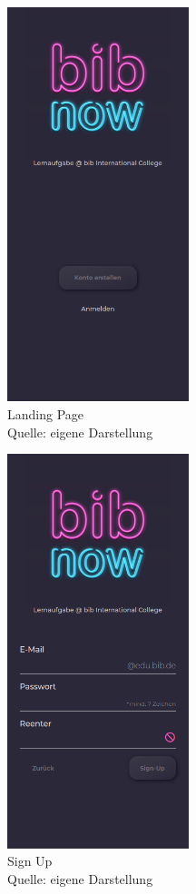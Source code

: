 \documentclass[12pt,titlepage]{article}
\begin{document}
\begin{figure}[hbt!]
\centering
\includegraphics[width=150pt]{screenshots/Screenshot_Mobil1.png}
\caption[Srenshot Landing Page]{Landing Page \\Quelle: eigene Darstellung}
\end{figure}

\begin{figure}[hbt!]
\centering
\includegraphics[width=150pt]{screenshots/Screenshot_Mobil2.png}
\caption[Srenshot Sign Up]{Sign Up \\Quelle: eigene Darstellung}
\end{figure}
\end{document}
